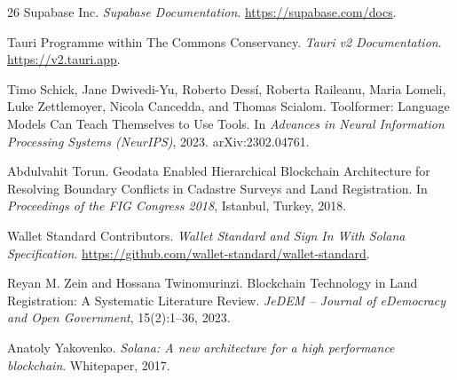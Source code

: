 \documentclass[10pt,a4paper,twocolumn]{article}
\begin{document}
\begin{thebibliography}{26}
Supabase Inc.
\newblock \emph{Supabase Documentation}.
\newblock \url{https://supabase.com/docs}.

Tauri Programme within The Commons Conservancy.
\newblock \emph{Tauri v2 Documentation}.
\newblock \url{https://v2.tauri.app}.

Timo Schick, Jane Dwivedi-Yu, Roberto Dess\'i, Roberta Raileanu, Maria Lomeli,
  Luke Zettlemoyer, Nicola Cancedda, and Thomas Scialom.
\newblock Toolformer: Language Models Can Teach Themselves to Use Tools.
\newblock In \emph{Advances in Neural Information Processing Systems (NeurIPS)}, 2023.
\newblock arXiv:2302.04761.

Abdulvahit Torun.
\newblock Geodata Enabled Hierarchical Blockchain Architecture for Resolving Boundary
  Conflicts in Cadastre Surveys and Land Registration.
\newblock In \emph{Proceedings of the FIG Congress 2018}, Istanbul, Turkey, 2018.

Wallet Standard Contributors.
\newblock \emph{Wallet Standard and Sign In With Solana Specification}.
\newblock \url{https://github.com/wallet-standard/wallet-standard}.

Reyan M. Zein and Hossana Twinomurinzi.
\newblock Blockchain Technology in Land Registration: A Systematic Literature Review.
\newblock \emph{JeDEM -- Journal of eDemocracy and Open Government}, 15(2):1--36, 2023.

Anatoly Yakovenko.
\newblock \emph{Solana: A new architecture for a high performance blockchain}.
\newblock Whitepaper, 2017.

\end{thebibliography}
\end{document}
